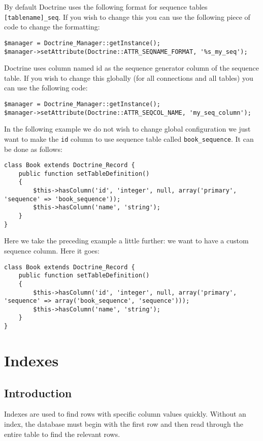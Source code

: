 \documentclass[11pt,a4paper]{report}
\begin{document}
By default Doctrine uses the following format for sequence tables \texttt{[tablename]\_seq}. If you wish to change this you can use the following piece of code to change the formatting:

\begin{verbatim}
$manager = Doctrine_Manager::getInstance();
$manager->setAttribute(Doctrine::ATTR_SEQNAME_FORMAT, '%s_my_seq');
\end{verbatim}

Doctrine uses column named id as the sequence generator column of the sequence table. If you wish to change this globally (for all connections and all tables) you can use the following code:

\begin{verbatim}
$manager = Doctrine_Manager::getInstance();
$manager->setAttribute(Doctrine::ATTR_SEQCOL_NAME, 'my_seq_column');
\end{verbatim}

In the following example we do not wish to change global configuration we just want to make the \texttt{id} column to use sequence table called \texttt{book\_sequence}. It can be done as follows:

\begin{verbatim}
class Book extends Doctrine_Record {
    public function setTableDefinition()
    {
        $this->hasColumn('id', 'integer', null, array('primary', 'sequence' => 'book_sequence'));
        $this->hasColumn('name', 'string');
    }
}
\end{verbatim}

Here we take the preceding example a little further: we want to have a custom sequence column. Here it goes:

\begin{verbatim}
class Book extends Doctrine_Record {
    public function setTableDefinition()
    {
        $this->hasColumn('id', 'integer', null, array('primary', 'sequence' => array('book_sequence', 'sequence')));
        $this->hasColumn('name', 'string');
    }
}
\end{verbatim}

\section{Indexes}
\subsection{Introduction}
Indexes are used to find rows with specific column values quickly. Without an index, the database must begin with the first row and then read through the entire table to find the relevant rows.
\end{document}
